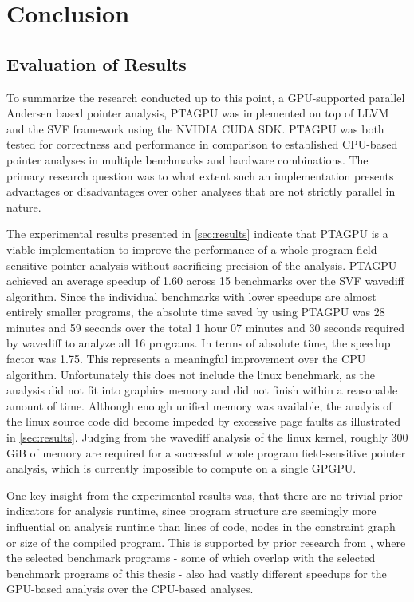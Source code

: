 \chapter{Conclusion}\label{chap:conclusion}

\section{Evaluation of Results}
To summarize the research conducted up to this point, a GPU-supported parallel Andersen based pointer analysis, PTAGPU was implemented on top of LLVM and the SVF framework using the NVIDIA CUDA SDK.
PTAGPU was both tested for correctness and performance in comparison to established CPU-based pointer analyses in multiple benchmarks and hardware combinations.
The primary research question was to what extent such an implementation presents advantages or disadvantages over other analyses that are not strictly parallel in nature.

The experimental results presented in \autoref{sec:results} indicate that PTAGPU is a viable implementation to improve the performance of a whole program field-sensitive pointer analysis without sacrificing precision of the analysis.
PTAGPU achieved an average speedup of 1.60 across 15 benchmarks over the SVF wavediff algorithm. Since the individual benchmarks with lower speedups are almost entirely smaller programs, the absolute time saved by using PTAGPU was 28 minutes and 59 seconds over the total 1 hour 07 minutes and 30 seconds required by wavediff to analyze all 16 programs. In terms of absolute time, the speedup factor was 1.75.
This represents a meaningful improvement over the CPU algorithm. 
Unfortunately this does not include the linux benchmark, as the analysis did not fit into graphics memory and did not finish within a reasonable amount of time.
Although enough unified memory was available, the analyis of the linux source code did become impeded by excessive page faults as illustrated in \autoref{sec:results}.
Judging from the wavediff analysis of the linux kernel, roughly 300 GiB of memory are required for a successful whole program field-sensitive pointer analysis, which is currently impossible to compute on a single GPGPU.

One key insight from the experimental results was, that there are no trivial prior indicators for analysis runtime, since program structure are seemingly more influential on analysis runtime than lines of code, nodes in the constraint graph or size of the compiled program.
This is supported by prior research from \cite{mendez2012gpu}, where the selected benchmark programs - some of which overlap with the selected benchmark programs of this thesis - also had vastly different speedups for the GPU-based analysis over the CPU-based analyses. 

